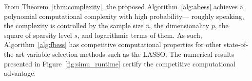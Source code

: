 From Theorem~\ref{thm:complexity}, the proposed Algorithm~\ref{alg:abess} achieves a polynomial computational complexity with high probability---
roughly speaking, the complexity is controlled by
the sample size $n$, the dimensionality $p$, the square of sparsity level $s$,
and logarithmic terms of them.
As such, Algorithm~\ref{alg:fbess} has competitive computational properties for other state-of-the-art variable selection methods such as the LASSO.
The numerical results presented in Figure~\ref{fig:simu_runtime} certify the competitive computational advantage.

